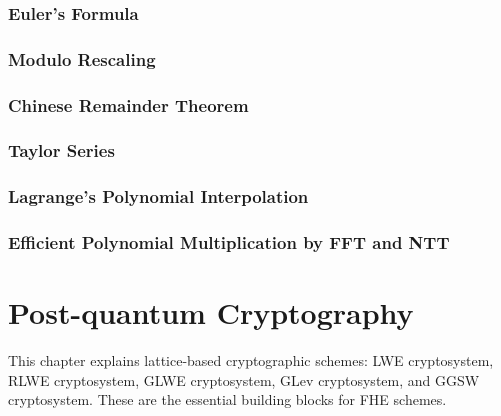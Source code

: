 \documentclass[11pt]{article}
\begin{document}
\clearpage

\section{Euler's Formula}
\label{sec:euler}


\clearpage

\section{Modulo Rescaling}
\label{sec:modulus-rescaling}


\clearpage

\section{Chinese Remainder Theorem}
\label{sec:chinese-remainder}


\clearpage

\section{Taylor Series}
\label{sec:taylor-series}


\clearpage

\section{Lagrange's Polynomial Interpolation}
\label{sec:polynomial-interpolation}


\clearpage

\section{Efficient Polynomial Multiplication by FFT and NTT}
\label{sec:ntt}


\clearpage





\part{Post-quantum Cryptography}
\label{part:pqc}

\renewcommand{\thesection}{B-\arabic{section}}
\setcounter{section}{0}

This chapter explains lattice-based cryptographic schemes: LWE cryptosystem, RLWE cryptosystem, GLWE cryptosystem, GLev cryptosystem, and GGSW cryptosystem. These are the essential building blocks for FHE schemes. 
\end{document}
